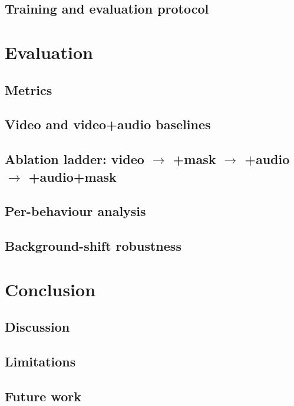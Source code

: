 \documentclass[12pt,a4paper]{report}
\begin{document}
\section{Training and evaluation protocol}

\chapter{Evaluation}
\label{ch:eval}
\section{Metrics}
\section{Video and video+audio baselines}
\section{Ablation ladder: video $\to$ +mask $\to$ +audio $\to$ +audio+mask}
\section{Per-behaviour analysis}
\section{Background-shift robustness}

\chapter{Conclusion}
\label{ch:conclusion}
\section{Discussion}
\section{Limitations}
\section{Future work}
\end{document}

